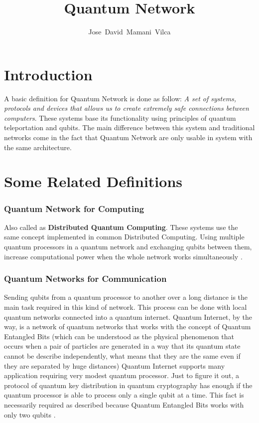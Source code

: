\documentclass[12pt,journal]{journal}
\begin{document}
\title{Quantum Network}

\author{Jose~David~Mamani~Vilca}%

\onecolumn

\maketitle

\section{Introduction}

A basic definition for Quantum Network is done as follow: \textit{A set of systems, protocols and devices that allows us to create extremely safe connections between computers}. These systems base its functionality using principles of quantum teleportation and qubits. The main difference between this system and traditional networks come in the fact that Quantum Network are only usable in system with the same architecture. 

\section{Some Related Definitions}

\subsubsection{Quantum Network for Computing}

Also called as \textbf{Distributed Quantum Computing}. These systems use the same concept implemented in common Distributed Computing. Using multiple quantum processors in a quantum network and exchanging qubits between them, increase computational power when the whole network works simultaneously \citep{kimble2008quantum} \citep{Caleffi:2018:QIC:3233188.3233224}.


\subsubsection{Quantum Networks for Communication}

Sending qubits from a quantum processor to another over a long distance is the main task required in this kind of network.  This process can be done with local quantum networks connected into a quantum internet. 
Quantum Internet, by the way, is a network of quantum networks that works with the concept of Quantum Entangled Bits (which can be understood as the physical phenomenon that occurs when a pair of particles are generated in a way that its quantum state cannot be describe independently, what means that they are the same even if they are separated by huge distances)
Quantum Internet supports many application requiring very modest quantum processor. Just to figure it out, a protocol of quantum key distribution in quantum cryptography has enough if the quantum processor is able to process only a single qubit at a time. This fact is necessarily required as described because Quantum Entangled Bits works with only two qubits \citep{pednault2017breaking}.
\end{document}
